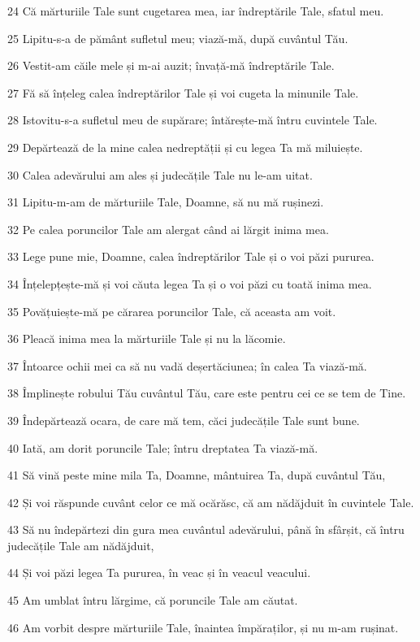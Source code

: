 \par 24 Că mărturiile Tale sunt cugetarea mea, iar îndreptările Tale, sfatul meu.
\par 25 Lipitu-s-a de pământ sufletul meu; viază-mă, după cuvântul Tău.
\par 26 Vestit-am căile mele și m-ai auzit; învață-mă îndreptările Tale.
\par 27 Fă să înțeleg calea îndreptărilor Tale și voi cugeta la minunile Tale.
\par 28 Istovitu-s-a sufletul meu de supărare; întărește-mă întru cuvintele Tale.
\par 29 Depărtează de la mine calea nedreptății și cu legea Ta mă miluiește.
\par 30 Calea adevărului am ales și judecățile Tale nu le-am uitat.
\par 31 Lipitu-m-am de mărturiile Tale, Doamne, să nu mă rușinezi.
\par 32 Pe calea poruncilor Tale am alergat când ai lărgit inima mea.
\par 33 Lege pune mie, Doamne, calea îndreptărilor Tale și o voi păzi pururea.
\par 34 Înțelepțește-mă și voi căuta legea Ta și o voi păzi cu toată inima mea.
\par 35 Povățuiește-mă pe cărarea poruncilor Tale, că aceasta am voit.
\par 36 Pleacă inima mea la mărturiile Tale și nu la lăcomie.
\par 37 Întoarce ochii mei ca să nu vadă deșertăciunea; în calea Ta viază-mă.
\par 38 Împlinește robului Tău cuvântul Tău, care este pentru cei ce se tem de Tine.
\par 39 Îndepărtează ocara, de care mă tem, căci judecățile Tale sunt bune.
\par 40 Iată, am dorit poruncile Tale; întru dreptatea Ta viază-mă.
\par 41 Să vină peste mine mila Ta, Doamne, mântuirea Ta, după cuvântul Tău,
\par 42 Și voi răspunde cuvânt celor ce mă ocărăsc, că am nădăjduit în cuvintele Tale.
\par 43 Să nu îndepărtezi din gura mea cuvântul adevărului, până în sfârșit, că întru judecățile Tale am nădăjduit,
\par 44 Și voi păzi legea Ta pururea, în veac și în veacul veacului.
\par 45 Am umblat întru lărgime, că poruncile Tale am căutat.
\par 46 Am vorbit despre mărturiile Tale, înaintea împăraților, și nu m-am rușinat.
